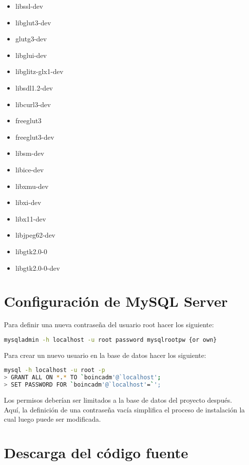\documentclass[12pt,spanish,a4paper]{report}
\begin{document}
\begin{itemize}
\item libssl-dev \item libglut3-dev \item glutg3-dev \item libglui-dev \item libglitz-glx1-dev \item libsdl1.2-dev \item libcurl3-dev \item freeglut3 \item freeglut3-dev \item libsm-dev \item libice-dev \item libxmu-dev \item libxi-dev \item libx11-dev \item libjpeg62-dev \item libgtk2.0-0 \item libgtk2.0-0-dev
\end{itemize}


\section{Configuración de MySQL Server}


Para definir una nueva contraseña del usuario root hacer los siguiente:

\begin{lstlisting}[frame=shadowbox, language=bash, basicstyle=\footnotesize, backgroundcolor=\color{gris}]
mysqladmin -h localhost -u root password mysqlrootpw {or own}
\end{lstlisting}

Para crear un nuevo usuario en la base de datos hacer los siguiente:

\begin{lstlisting}[frame=shadowbox, language=bash, basicstyle=\footnotesize, backgroundcolor=\color{gris}]
mysql -h localhost -u root -p
> GRANT ALL ON *.* TO `boincadm'@`localhost';
> SET PASSWORD FOR `boincadm'@`localhost'=`'; 
\end{lstlisting}

Los permisos deberían ser limitados a la base de datos del proyecto después. Aquí, la definición de una contraseña vacía simplifica el proceso de instalación la cual luego puede ser modificada.


\section{Descarga del código fuente}
\end{document}
